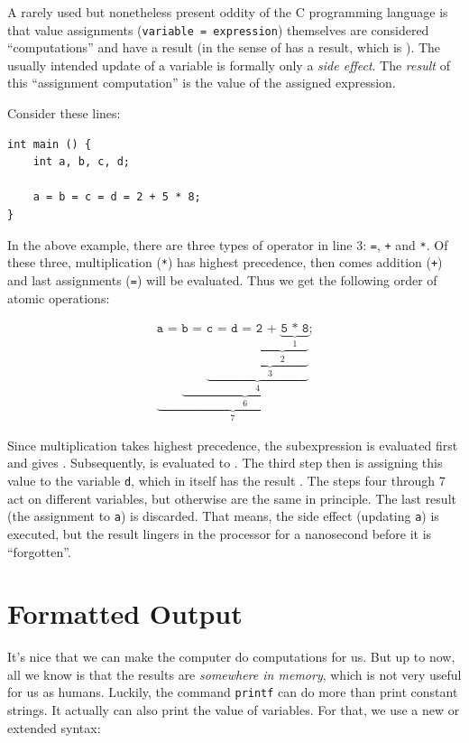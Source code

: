 A rarely used but nonetheless present oddity of the C programming language is that value assignments (\texttt{variable = expression}) themselves are considered \enquote{computations} and have a result (in the sense of  has a result, which is ). The usually intended update of a variable is formally only a \emph{side effect}. The \emph{result} of this \enquote{assignment computation} is the value of the assigned expression.

Consider these lines:
\begin{codebox}[chainAssignment.c]
\begin{verbatim}
int main () {
    int a, b, c, d;
   
    a = b = c = d = 2 + 5 * 8;
}
\end{verbatim}
\end{codebox}
In the above example, there are three types of operator in line 3: \texttt{=}, \texttt{+} and \texttt{*}. Of these three, multiplication (\texttt{*}) has highest precedence, then comes addition (\texttt{+}) and last assignments (\texttt{=}) will be evaluated. Thus we get the following order of atomic operations:

\begin{defbox}
\begin{align*}
	\underbrace{
		\texttt{a = }
		\underbrace{
			\texttt{b = }
			\underbrace{
				\texttt{c = }
				\underbrace{
					\texttt{d = }
					\underbrace{
						\texttt{2 + }
						\underbrace{
							\texttt{5 * 8}
						}_{1}
					}_{2}
				}_{3}
			}_{4}
		}_{6}
	}_{7}
	\texttt{;}
\end{align*}

Since multiplication takes highest precedence, the subexpression  is evaluated first and gives . Subsequently,  is evaluated to . The third step then is assigning this value  to the variable \texttt{d}, which in itself has the result . The steps four through 7 act on different variables, but otherwise are the same in principle. The last result (the assignment to \texttt{a}) is discarded. That means, the side effect (updating \texttt{a}) is executed, but the result  lingers in the processor for a nanosecond before it is \enquote{forgotten}.
\end{defbox}


\section{Formatted Output}
It's nice that we can make the computer do computations for us. But up to now, all we know is that the results are \emph{somewhere in memory}, which is not very useful for us as humans. Luckily, the command \texttt{printf} can do more than print constant strings. It actually can also print the value of variables. For that, we use a new or extended syntax:

